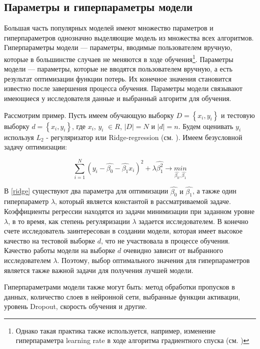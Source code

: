 \documentclass[a4paper, 14pt]{article}
\begin{document}
\subsection{Параметры и гиперпараметры модели}
Большая часть популярных моделей имеют множество параметров и гиперпараметров однозначно выделяющие модель из множества всех алгоритмов. Гиперпараметры модели --- параметры, вводимые пользователем вручную, которые в большинстве случаев не меняются в ходе обучения\footnote{Однако такая практика также используется, например, изменение гиперпараметра  learning rate в ходе алгоритма градиентного спуска (см. \cite{zeiler2012adadelta})}. Параметры модели --- параметры, которые не вводятся пользователем вручную, а есть результат оптимизации функции потерь. Их конечное значения становится известно после завершения процесса обучения. Параметры модели связывают имеющиеся у исследователя данные и выбранный алгоритм для обучения. 

Рассмотрим пример. Пусть имеем обучающую выборку $D = \left\{x_i, y_i\right\}$ и тестовую выборку $d = \left\{x_i, y_i\right\}$, где $x_i$, $y_i$ $\in R$, $\left|D\right| = N$ и $\left|d\right| = n$. Будем оценивать $y_i$ используя $L_2$ - регуляризатор или Ridge-regression (см. \cite{hoerl1970ridge}). Имеем безусловной задачу оптимизации:


\begin{equation} \label{ridge} %
\sum_{i=1}^{N} (y_i - \hat{\beta_0} - \hat{\beta_1} x_i)^2 + \lambda \hat{\beta_1^2} \rightarrow \underset{\hat{\beta_0}, \hat{\beta_1}}{min}
\end{equation} 

В \eqref{ridge} существуют два параметра для оптимизации $\hat{\beta_0} \text{ и } \hat{\beta_1}$, а также один гиперпараметр $\lambda$, который является константой в рассматриваемой задаче. Коэффициенты регрессии находятся из задачи минимизации при заданном уровне $\lambda$, в то время, как степень регуляризации $\lambda$ задается исследователем. В конечно счете исследователь заинтересован в создании модели, которая имеет высокое качество на тестовой выборке $d$, что не участвовала в процессе обучения. Качество работы модели на выборке $d$ очевидно зависит от выбранного исследователем $\lambda$. Поэтому, выбор оптимального значения для гиперпараметров является также важной задачи для получения лучшей модели.

Гиперпараметрами модели также могут быть: метод обработки пропусков в данных, количество слоев в нейронной сети, выбранные функции активации, уровень Dropout, скорость обучения и другие. 
\end{document}
